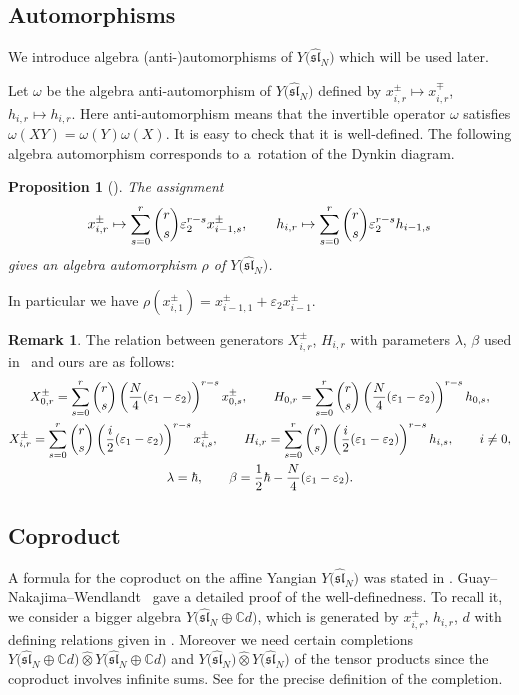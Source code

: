 \documentclass[pdftex]{sigma}
\newtheorem{prop}[thm]{Proposition}
\theoremstyle{definition}
\newtheorem{rem}[thm]{Remark}
\numberwithin{equation}{section}
\newcommand{\ve}{\varepsilon}
\newcommand{\bbC}{\mathbb{C}}
\newcommand{\affY}{Y\big(\affsl\big)}
\newcommand{\affsl}{\hat{\mathfrak{sl}}_N}
\begin{document}
\subsection{Automorphisms}

We introduce algebra (anti-)automorphisms of $\affY$ which will be used later.

Let $\omega$ be the algebra anti-automorphism of $\affY$ defined by $x_{i,r}^{\pm} \mapsto x_{i,r}^{\mp}$, $h_{i,r} \mapsto h_{i,r}$. Here anti-automorphism means that the invertible operator $\omega$ satisfies $\omega(XY)=\omega(Y)\omega(X)$. It is easy to check that it is well-defined. The following algebra automorphism corresponds to a~rotation of the Dynkin diagram.
\begin{prop}[{\cite[Lemma~3.5]{MR2199856}}] The assignment
\begin{gather*}
x_{i,r}^{\pm} \mapsto \sum_{s=0}^r \dbinom{r}{s} \ve_2^{r-s} x_{i-1,s}^{\pm}, \qquad h_{i,r} \mapsto \sum_{s=0}^r \dbinom{r}{s} \ve_2^{r-s} h_{i-1,s}
\end{gather*}
gives an algebra automorphism $\rho$ of $\affY$.
\end{prop}
In particular we have $\rho(x_{i,1}^{\pm}) = x_{i-1,1}^{\pm} + \ve_2 x_{i-1}^{\pm}$.
\begin{rem}The relation between generators $X_{i,r}^{\pm}$, $H_{i,r}$ with parameters $\lambda$, $\beta$ used in~\cite{MR2199856,MR2323534} and ours are as follows:
\begin{gather*}
X_{0,r}^{\pm} = \sum_{s=0}^r \dbinom{r}{s} \left( \dfrac{N}{4}(\ve_1-\ve_2)\right)^{r-s} x_{0,s}^{\pm},\qquad H_{0,r} = \sum_{s=0}^r \dbinom{r}{s} \left( \dfrac{N}{4}(\ve_1-\ve_2)\right)^{r-s} h_{0,s},\\
X_{i,r}^{\pm} = \sum_{s=0}^r \dbinom{r}{s} \left( \dfrac{i}{2}(\ve_1-\ve_2)\right)^{r-s} x_{i,s}^{\pm}, \qquad H_{i,r} = \sum_{s=0}^r \dbinom{r}{s} \left( \dfrac{i}{2}(\ve_1-\ve_2)\right)^{r-s} h_{i,s}, \qquad i \neq 0,\\
\lambda = \hbar, \qquad \beta = \frac{1}{2} \hbar - \dfrac{N}{4}(\ve_1-\ve_2).
\end{gather*}
\end{rem}

\subsection{Coproduct}

A formula for the coproduct on the affine Yangian $\affY$ was stated in \cite{MR2323534}. Guay--Nakajima--Wendlandt~\cite{MR3861718} gave a detailed proof of the well-definedness. To recall it, we consider a bigger algebra $Y\big(\affsl \oplus \bbC d\big)$, which is generated by $x_{i,r}^{\pm}$, $h_{i,r}$, $d$ with defining relations given in \cite[equation~(2.8)]{MR3861718}. Moreover we need certain completions $Y\big(\affsl \oplus \bbC d\big) \widehat{\otimes} Y\big(\affsl \oplus \bbC d\big)$ and $\affY \widehat{\otimes} \affY$ of the tensor products since the coproduct involves infinite sums. See \cite[Section~5]{MR3861718} for the precise definition of the completion.
\end{document}
